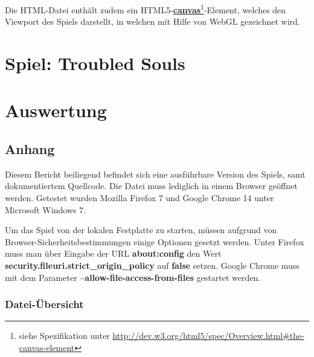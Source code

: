 Die HTML-Datei enthält zudem ein HTML5-\textbf{\href{http://dev.w3.org/html5/spec/Overview.html\#the-canvas-element}{canvas}}\footnote{siehe Spezifikation unter \url{http://dev.w3.org/html5/spec/Overview.html\#the-canvas-element}}-Element, welches den Viewport des Spiels darstellt, in welchen mit Hilfe von WebGL gezeichnet wird.













\part{Spiel: Troubled Souls}



\part{Auswertung}



\chapter*{Anhang}

Diesem Bericht beiliegend befindet sich eine ausführbare Version des Spiels, samt dokumentiertem Quellcode. Die Datei  muss lediglich in einem Browser geöffnet werden. Getestet wurden Mozilla Firefox 7 und Google Chrome 14 unter Microsoft Windows 7.

Um das Spiel von der lokalen Festplatte zu starten, müssen aufgrund von Browser-Sicherheitsbestimmungen einige Optionen gesetzt werden. Unter Firefox muss man über Eingabe der URL \textbf{about:config} den Wert \textbf{security.fileuri.strict\_origin\_policy} auf \textbf{false} setzen. Google Chrome muss mit dem Parameter \textbf{--allow-file-access-from-files} gestartet werden.

\section*{Datei-Übersicht}

